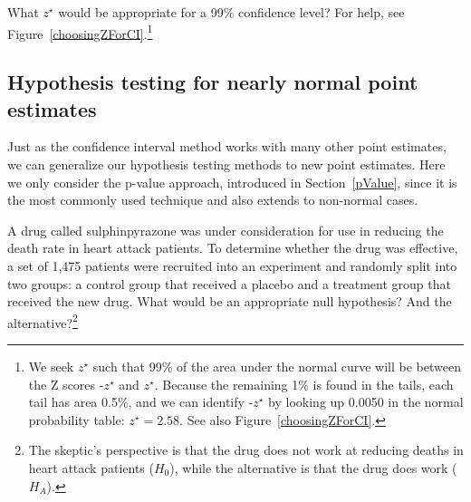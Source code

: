 \begin{exercise} \label{findZFor99PercConfLevelInFrameworkForInf}
What $z^{\star}$ would be appropriate for a 99\% confidence level? For help, see Figure~\vref{choosingZForCI}.\footnote{We seek $z^{\star}$ such that 99\% of the area under the normal curve will be between the Z scores -$z^{\star}$ and $z^{\star}$. Because the remaining 1\% is found in the tails, each tail has area 0.5\%, and we can identify -$z^{\star}$ by looking up 0.0050 in the normal probability table: $z^{\star} = 2.58$. See also Figure~\vref{choosingZForCI}.}
\end{exercise}


\subsection{Hypothesis testing for nearly normal point estimates}

Just as the confidence interval method works with many other point estimates, we can generalize our hypothesis testing methods to new point estimates. Here we only consider the p-value approach, introduced in Section~\ref{pValue}, since it is the most commonly used technique and also extends to non-normal cases.

\begin{exercise} \label{fdaHypSetupForSulph}
A drug called sulphinpyrazone was under consideration for use in reducing the death rate in heart attack patients. To determine whether the drug was effective, a set of 1,475 patients were recruited into an experiment and randomly split into two groups: a control group that received a placebo and a treatment group that received the new drug. What would be an appropriate null hypothesis? And the alternative?\footnote{The skeptic's perspective is that the drug does not work at reducing deaths in heart attack patients ($H_0$), while the alternative is that the drug does work ($H_A$).}
\end{exercise}

